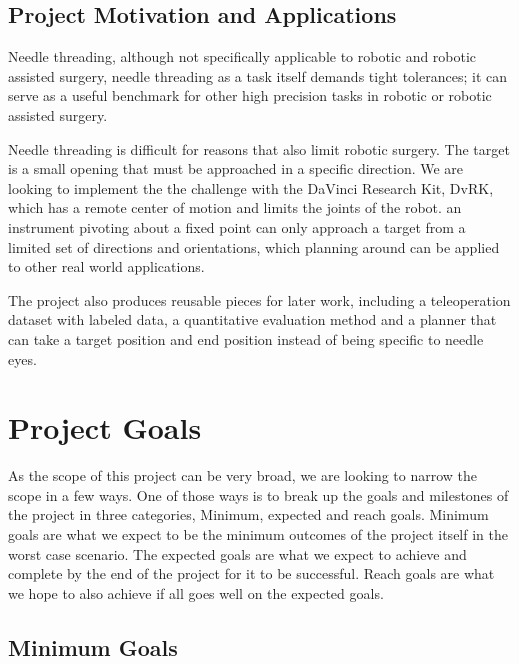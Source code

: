 \documentclass[conference]{IEEEtran}
\begin{document}
\subsection{Project Motivation and Applications}
Needle threading, although not specifically applicable to robotic and robotic assisted surgery, needle threading as a task itself demands tight tolerances; it can serve as a useful benchmark for other high precision tasks in robotic or robotic assisted surgery.

Needle threading is difficult for reasons that also limit robotic surgery. The target is a small opening that must be approached in a specific direction. We are looking to implement the the challenge with the DaVinci Research Kit, DvRK, which has a remote center of motion and limits the joints of the robot. an instrument pivoting about a fixed point can only approach a target from a limited set of directions and orientations, which planning around can be applied to other real world applications. 

The project also produces reusable pieces for later work, including a teleoperation dataset with labeled data, a quantitative evaluation method and a planner that can take a target position and end position instead of being specific to needle eyes.

\section{Project Goals}
As the scope of this project can be very broad, we are looking to narrow the scope in a few ways. One of those ways is to break up the goals and milestones of the project in three categories, Minimum, expected and reach goals. Minimum goals are what we expect to be the minimum outcomes of the project itself in the worst case scenario. The expected goals are what we expect to achieve and complete by the end of the project for it to be successful. Reach goals are what we hope to also achieve if all goes well on the expected goals. 


\subsection{Minimum Goals}
\end{document}
